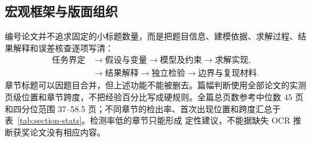 \subsection{宏观框架与版面组织}

编号论文并不追求固定的小标题数量，而是把题目信息、建模依据、求解过程、结果解释和误差核查逐项写清：
\[
\begin{aligned}
\text{任务界定}&\longrightarrow\text{假设与变量}
\longrightarrow\text{模型及约束}\longrightarrow\text{求解实现},\\
&\longrightarrow\text{结果解释}
\longrightarrow\text{独立检验}\longrightarrow\text{边界与复现材料}.
\end{aligned}
\]
章节标题可以因题目合并，但上述功能不能被删去。篇幅判断使用全部论文的实测
页级位置和章节跨度，不把经验百分比写成硬规则。全篇总页数参考中位数
45 页和四分位范围 37--58.5 页；不同章节的检出率、首次出现位置和跨度汇总于
表~\ref{tab:section-stats}。检测率低的章节只能形成
定性建议，不能据缺失 OCR 推断获奖论文没有相应内容。

